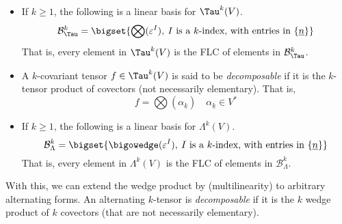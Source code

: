 \documentclass[../main-v2-manifolds.tex]{subfiles}
\begin{document}
\begin{itemize}
    \item If $k\geq 1$, the following is a linear basis for $\Tau^k(V)$.
    \begin{equation}
        \mathcal{B}^k_{\Tau} = \bigset{\bigotimes(\varepsilon^{I}),\: I\text{ is a }k\text{-index, with entries in }\{\underline{n}\}}
        \label{eq:k tensor basis}
    \end{equation}
    That is, every element in $\Tau^k(V)$ is the FLC of elements in $\mathcal{B}^k_{\Tau}$. 
    \item A $k$-covariant tensor $f\in \Tau^k(V)$ is said to be \emph{decomposable} if it is the $k$-tensor product of covectors (not necessarily elementary). That is, 
    \[
        f=\bigotimes(\alpha_{\underline{k}})\quad\alpha_{\underline{k}}\in V^*
    \]
    \item If $k\geq 1$, the following is a linear basis for $\Lambda^k(V)$.
    \begin{equation}
        \mathcal{B}^k_{\Lambda} = \bigset{\bigowedge(\varepsilon^{I}),\: I\text{ is a }k\text{-index, with entries in }\{\underline{n}\}}
        \label{eq:k tensor basis}
    \end{equation}
    That is, every element in $\Lambda^k(V)$ is the FLC of elements in $\mathcal{B}^k_{\Lambda}$.
\end{itemize}
With this, we can extend the wedge product by (multilinearity) to arbitrary alternating forms. An alternating $k$-tensor is \emph{decomposable} if it is the $k$ wedge product of $k$ covectors (that are not necessarily elementary).\\
\end{document}
